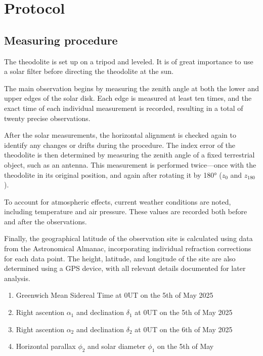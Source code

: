 
\def\skalierung{0.65}

\chapter{Protocol}

\label{chap:protokoll}
\section{Measuring procedure}

The theodolite is set up on a tripod and leveled. It is of great importance to use a solar filter before directing the theodolite at the sun. 

The main observation begins by measuring the zenith angle at both the lower and upper edges of the solar disk. Each edge is measured at least ten times, and the exact time of each individual measurement is recorded, resulting in a total of twenty precise observations.

After the solar measurements, the horizontal alignment is checked again to identify any changes or drifts during the procedure. The index error of the theodolite is then determined by measuring the zenith angle of a fixed terrestrial object, such as an antenna. This measurement is performed twice—once with the theodolite in its original position, and again after rotating it by 180° ($z_0$ and $z_{180}$).

To account for atmospheric effects, current weather conditions are noted, including temperature and air pressure. These values are recorded both before and after the observations.

Finally, the geographical latitude of the observation site is calculated using data from the Astronomical Almanac, incorporating individual refraction corrections for each data point. The height, latitude, and longitude of the site are also determined using a GPS device, with all relevant details documented for later analysis. 

\begin{enumerate}
    \item Greenwich Mean Sidereal Time at 0UT on the 5th of May 2025
    \item Right ascention $\alpha_1$ and declination $\delta_1$ at 0UT on the 5th of May 2025
    \item Right ascention $\alpha_2$ and declination $\delta_2$ at 0UT on the 6th of May 2025
    \item Horizontal parallax $\phi_2$ and solar diameter $\phi_1$ on the 5th of May
\end{enumerate}

